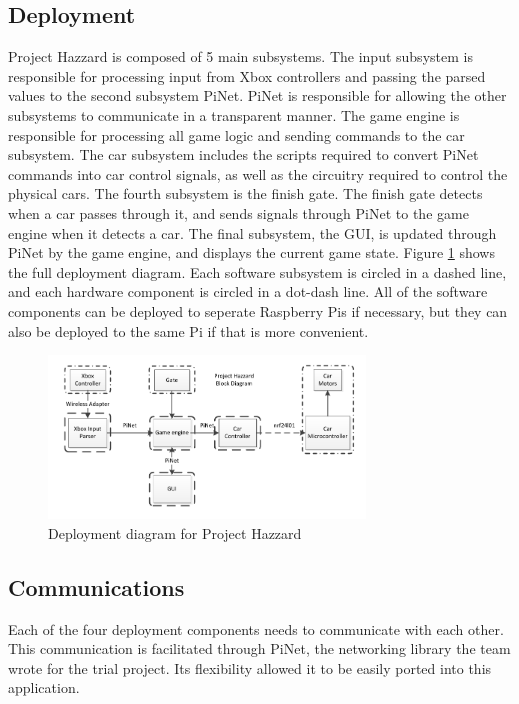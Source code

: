 \documentclass[letterpaper,fleqn]{article}
\begin{document}
\subsection{Deployment}
Project Hazzard is composed of 5 main subsystems. The input subsystem is responsible for processing input from Xbox controllers and passing the parsed values to the second subsystem PiNet. PiNet is responsible for allowing the other subsystems to communicate in a transparent manner. The game engine is responsible for processing all game logic and sending commands to the car subsystem. The car subsystem includes the scripts required to convert PiNet commands into car control signals, as well as the circuitry required to control the physical cars. The fourth subsystem is the finish gate. The finish gate detects when a car passes through it, and sends signals through PiNet to the game engine when it detects a car. The final subsystem, the GUI, is updated through PiNet by the game engine, and displays the current game state. Figure \ref{fig:deploy} shows the full deployment diagram. Each software subsystem is circled in a dashed line, and each hardware component is circled in a dot-dash line. All of the software components can be deployed to seperate Raspberry Pis if necessary, but they can also be deployed to the same Pi if that is more convenient.
\begin{figure}[ht]
\centering
\includegraphics[width=0.75\textwidth]{Project-Block-Diagram-Deployment.pdf}
\caption{Deployment diagram for Project Hazzard}
\label{fig:deploy}
\end{figure}

\subsection{Communications}
Each of the four deployment components needs to communicate with each other. This communication is facilitated through PiNet, the networking library the team wrote for the trial project. Its flexibility allowed it to be easily ported into this application.
\end{document}
